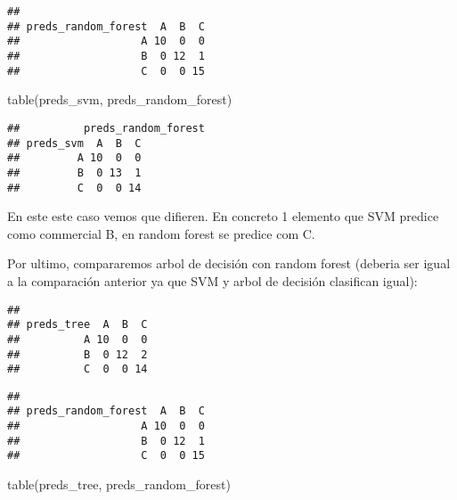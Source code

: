 \documentclass[]{article}
\newenvironment{Shaded}{\begin{snugshade}}{\end{snugshade}}
\newcommand{\KeywordTok}[1]{\textcolor[rgb]{0.94,0.87,0.69}{#1}}
\newcommand{\OperatorTok}[1]{\textcolor[rgb]{0.94,0.94,0.82}{#1}}
\newcommand{\NormalTok}[1]{\textcolor[rgb]{0.80,0.80,0.80}{#1}}
\begin{document}
\begin{verbatim}
##                    
## preds_random_forest  A  B  C
##                   A 10  0  0
##                   B  0 12  1
##                   C  0  0 15
\end{verbatim}

\begin{Shaded}
\begin{Highlighting}[]
\KeywordTok{table}\NormalTok{(preds_svm, preds_random_forest)}
\end{Highlighting}
\end{Shaded}

\begin{verbatim}
##          preds_random_forest
## preds_svm  A  B  C
##         A 10  0  0
##         B  0 13  1
##         C  0  0 14
\end{verbatim}

En este este caso vemos que difieren. En concreto 1 elemento que SVM
predice como commercial B, en random forest se predice com C.

Por ultimo, compararemos arbol de decisión con random forest (deberia
ser igual a la comparación anterior ya que SVM y arbol de decisión
clasifican igual):

\begin{Shaded}
\end{Shaded}

\begin{verbatim}
##           
## preds_tree  A  B  C
##          A 10  0  0
##          B  0 12  2
##          C  0  0 14
\end{verbatim}

\begin{Shaded}
\end{Shaded}

\begin{verbatim}
##                    
## preds_random_forest  A  B  C
##                   A 10  0  0
##                   B  0 12  1
##                   C  0  0 15
\end{verbatim}

\begin{Shaded}
\begin{Highlighting}[]
\KeywordTok{table}\NormalTok{(preds_tree, preds_random_forest)}
\end{Highlighting}
\end{Shaded}
\end{document}
